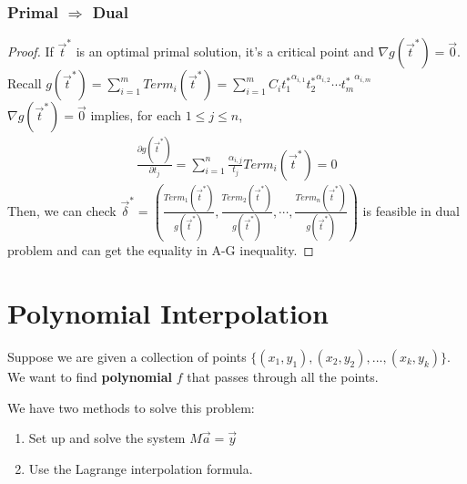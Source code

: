 \documentclass[11pt,a4paper]{article}
\newtheorem{theorem}{Theorem}
\begin{document}
\subsubsection*{Primal $\Rightarrow$ Dual}
\begin{center}
\end{center}
\begin{proof}
    If $\vec{t}^*$ is an optimal primal solution, it's a critical point and $\nabla g(\vec{t}^*)=\vec{0}$. Recall $g(\vec{t}^*)=\sum_{i=1}^m{Term}_i(\vec{t}^*)=\sum_{i=1}^mC_i{t_1^*}^{\alpha_{i,1}}{t_2^*}^{\alpha_{i,2}}\cdots {t_m^*}^{\alpha_{i,m}}$\\
    $\nabla g(\vec{t}^*)=\vec{0}$ implies, for each $1\leq j\leq n$,
    \begin{equation}
        \begin{aligned}
            \frac{\partial g(\vec{t}^*)}{\partial t_j}=\sum_{i=1}^n\frac{\alpha_{i,j}}{t_j}{Term}_i(\vec{t}^*)=0
        \end{aligned}
        \nonumber
    \end{equation}
    Then, we can check $\vec{\delta}^*=\left(\frac{{Term}_1(\vec{t}^*)}{g(\vec{t}^*)},\frac{{Term}_2(\vec{t}^*)}{g(\vec{t}^*)},\cdots,\frac{{Term}_n(\vec{t}^*)}{g(\vec{t}^*)}\right)$ is feasible in dual problem and can get the equality in A-G inequality.
\end{proof}






\section{Polynomial Interpolation}
Suppose we are given a collection of points $\{(x_1,y_1),(x_2,y_2),...,(x_k,y_k)\}$. We want to find \textbf{polynomial} $f$ that passes through all the points.

We have two methods to solve this problem:
\begin{enumerate}[(1)]
    \item Set up and solve the system $M\vec{a}=\vec{y}$
    \item Use the Lagrange interpolation formula.
\end{enumerate}
\end{document}
